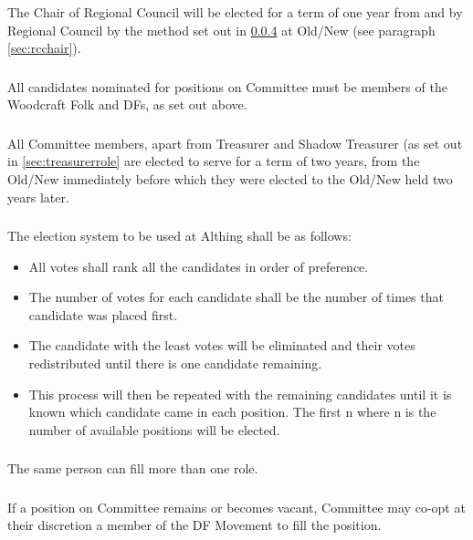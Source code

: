 \documentclass[a4paper, 12pt]{report}
\begin{document}
\subsubsection{}
The Chair of Regional Council will be elected for a term of one year from and by Regional Council by the method set out in \ref{sec:electionprocedure} at Old/New (see paragraph \ref{sec:rcchair}).

\subsubsection{}
All candidates nominated for positions on Committee must be members of the Woodcraft Folk and DFs, as set out above.

\subsubsection{}
All Committee members, apart from Treasurer and Shadow Treasurer (as set out in \ref{sec:treasurerrole} are elected to serve for a term of two years, from the Old/New immediately before which they were elected to the Old/New held two years later.

\subsubsection{}
\label{sec:electionprocedure}
The election system to be used at Althing shall be as follows:
\begin{itemize}
\item All votes shall rank all the candidates in order of preference.
\item The number of votes for each candidate shall be the number of times that candidate was placed first.
\item The candidate with the least votes will be eliminated and their votes redistributed until there is one candidate remaining.
\item This process will then be repeated with the remaining candidates until it is known which candidate came in each position. The first n where n is the number of available positions will be elected.
\end{itemize}

\subsubsection{}
\label{sec:moreroles}
The same person can fill more than one role.

\subsubsection{}
If a position on Committee remains or becomes vacant, Committee may co-opt at their discretion a member of the DF Movement to fill the position.
\end{document}
